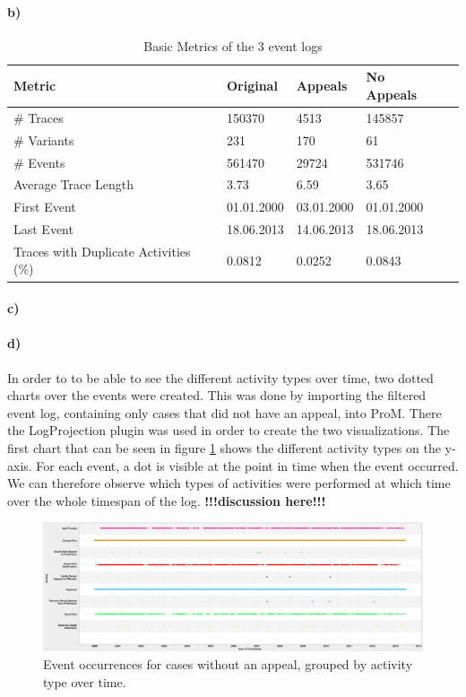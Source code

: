 \documentclass[12pt]{report}
\begin{document}
\paragraph{\textbf{b)}}

\begin{table}[H]
\centering
\begin{tabular}{|l|l|l|l|l|}
	\hline \textbf{Metric} & \textbf{Original} & \textbf{Appeals} & \textbf{No Appeals} \\
	\hline \# Traces & 150370 & 4513 & 145857\\
	\hline \# Variants & 231 & 170 &61\\
	\hline \# Events & 561470 & 29724 & 531746\\
	\hline Average Trace Length & 3.73 & 6.59 & 3.65\\
	\hline First Event & 01.01.2000 & 03.01.2000 & 01.01.2000\\
	\hline Last Event & 18.06.2013 & 14.06.2013 & 18.06.2013\\
	\hline Traces with Duplicate Activities (\%)  & 0.0812 & 0.0252 & 0.0843\\
	\hline
\end{tabular}
\caption{Basic Metrics of the 3 event logs}
\label{tab:1b}
\end{table}

\paragraph{\textbf{c)}}

\paragraph{\textbf{d)}} In order to to be able to see the different activity types over time, two dotted charts over the events were created. This was done by importing the filtered event log, containing only cases that did not have an appeal, into ProM. There the LogProjection plugin was used in order to create the two visualizations. The first chart that can be seen in figure \ref{fig:dotted_timestamp} shows the different activity types on the y-axis. For each event, a dot is visible at the point in time when the event occurred. We can therefore observe which types of activities were performed at which time over the whole timespan of the log. \textbf{!!!discussion here!!!}

\begin{figure}[H]
  \centering
  \includegraphics[width=\textwidth]{figures/dotted_timestamp.png}
  \caption{Event occurrences for cases without an appeal, grouped by activity type over time.}
  \label{fig:dotted_timestamp}
\end{figure}
\end{document}
